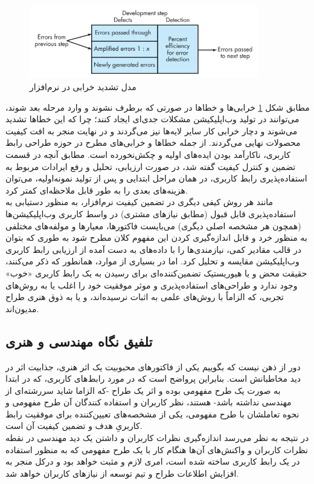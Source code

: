 \begin{figure}[H]
	\centering\includegraphics[width=10cm]{Resources/defect.PNG}
	\caption{مدل تشدید خرابی در نرم‌افزار
		\cite{pressman_software_2015}
	}
	\label{fig:defect}
\end{figure}
مطابق شکل
\ref{fig:defect}
خرابی‌ها و خطاها در صورتی که برطرف نشوند و وارد مرحله بعد شوند، می‌توانند در تولید وب‌اپلیکیشن مشکلات جدی‌ای ایجاد کنند؛ چرا که این خطاها تشدید می‌شوند و دچار خرابی کار سایر لایه‌ها نیز می‌گردند و در نهایت منجر به افت کیفیت محصولات نهایی می‌گردند. از جمله خطاها و خرابی‌های مطرح در حوزه طراحی رابط کاربری، ناکارآمد بودن ایده‌های اولیه و چکش‌نخورده است. مطابق آنچه در قسمت تضمین و کنترل کیفیت گفته شد، در صورت ارزیابی، تحلیل و رفع ایرادات مربوط به استفاده‌پذیری رابط کاربری، در همان مراحل ابتدایی و پس از تولید نمونه‌اولیه، می‌توان هزینه‌های بعدی را به طور قابل ملاحظه‌ای کمتر کرد.\\
مانند هر روش کیفی دیگری در تضمین کیفیت نرم‌افزار، به منظور دستیابی به استفاده‌پذیری قابل قبول (مطابق نیازهای مشتری) در واسط کاربری وب‌اپلیکیشن‌ها (همچون هر مشخصه اصلی دیگری) می‌بایست فاکتورها، معیارها و مولفه‌های مختلفی به منظور خرد و قابل اندازه‌گیری کردن این مفهوم کلان مطرح شود به طوری که بتوان در قالب مقادیر کمی، نیازمندی‌ها را با داده‌های به دست آمده از ارزیابی رابط کاربری وب‌اپلیکیشن مقایسه و تحلیل کرد. اما در بسیاری از موارد، همانطور که
\cite{agarwal_assessing_2002,p._miguel_review_2014, albert_measuring_2013}
ذکر می‌کنند، حقیقت محض و یا هیوریستیک تضمین‌کننده‌ای برای رسیدن به یک رابط کاربری «خوب» وجود ندارد و طراحی‌های استفاده‌پذیری و موثر موفقیت خود را اغلب یا به روش‌های تجربی، که الزاماً با روش‌های علمی به اثبات نرسیده‌اند، و یا به ذوق هنری طراح مدیون‌اند.
\subsection{تلفیق نگاه مهندسی و هنری}
دور از ذهن نیست که بگوییم یکی از فاکتورهای محبوبیت یک اثر هنری، جذابیت اثر در دید مخاطبانش است. بنابراین پرواضح است که در مورد رابط‌های کاربری، که در ابتدا به صورت یک طرح مفهومی بوده و اثر یک طراح -که الزاما شاید سررشته‌ای از مهندسی نداشته باشد- هستند، نظر کاربران و استفاده کنندگان آن طرح مفهومی و نحوه تعاملشان با طرح مفهومی، یکی از مشخصه‌های تعیین‌کننده برای موفقیت رابط کاربریِ هدف و تضمین کیفیت آن است.\\
در نتیجه به نظر می‌رسد اندازه‌گیری نظرات کاربران و داشتن یک دید مهندسی در نقطه نظرات کاربران و واکنش‌های آن‌ها هنگام کار با یک طرح مفهومی که به منظور استفاده در یک رابط کاربری ساخته شده است، امری لازم و مثبت خواهد بود و درکل منجر به افزایش اطلاعات طراح و تیم توسعه از نیازهای کاربران خواهد شد.

